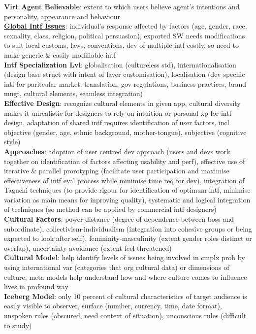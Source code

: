 \documentclass[a4paper]{article}
\begin{document}
\begin{multicols}{3}
        \textbf{Virt Agent Believable}: extent to which users believe agent's intentions and personality, appearance and behaviour\\
        \underline{\textbf{Global Intf Issues}}: individual's response affected by factors (age, gender, race, sexuality, class, religion, political persuasion), exported SW needs modifications to suit local customs, laws, conventions, dev of multiple intf costly, so need to make generic \& easily modifiable intf\\
        \textbf{Intf Specialization Lvl}: globalisation (cultureless std), internationalisation (design base struct with intent of layer customisation), localisation (dev specific intf for paritcular market, translation, gov regulations, business practices, brand mngt, cultural elements, seamless integration)\\
        \textbf{Effective Design}: recognize cultural elements in given app, cultural diversity makes it unrealistic for designers to rely on intuition or personal xp for intf design, adaptation of shared intf requires identification of user factors, incl objective (gender, age, ethnic background, mother-tongue), subjective (cognitive style)\\
        \textbf{Approaches}: adoption of user centred dev approach (users and devs work together on identification of factors affecting usability and perf), effective use of iterative \& parallel prorotyping (facilitate user participation and maximise effectiveness of intf eval process while minimise time req for dev), integration of Taguchi techniques (to provide rigour for identification of optimum intf, minimise variation as main means for inproving quality), systematic and logical integration of techniques (so method can be applied by commercial intf designers)\\
        \textbf{Cultural Factors}: power distance (degree of dependence between boss and subordinate), collectivism-individualism (integration into cohesive groups or being expected to look after self), femininity-masculinity (extent gender roles distinct or overlap), uncertainty avoidance (extent feel threatened)\\
        \textbf{Cultural Model}: help identify levels of issues being involved in cmplx prob by using international var (categories that org cultural data) or dimensions of culture, meta models help understand how and where culture comes to influence lives in profound way\\
        \textbf{Iceberg Model}: only 10 percent of cultural characteristics of target audience is easily visible to observer, surface (number, currency, time, date format), unspoken rules (obscured, need context of situation), unconscious rules (difficult to study)\\

\end{multicols}
\end{document}
